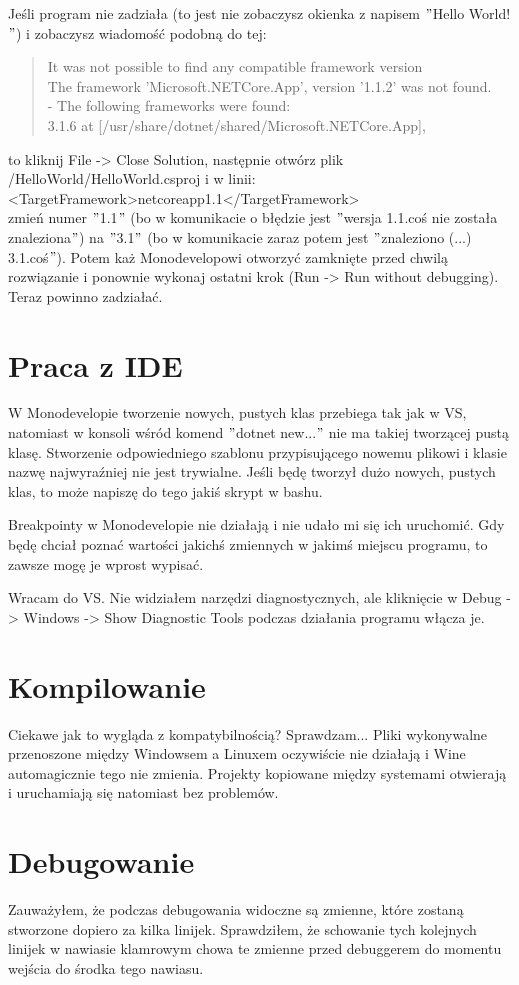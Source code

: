 \documentclass[10pt]{article}
\begin{document}
Jeśli program nie zadziała (to jest nie zobaczysz okienka z napisem $"$Hello World!$"$) i zobaczysz wiadomość podobną do tej:
\begin{quote}
It was not possible to find any compatible framework version\\
The framework 'Microsoft.NETCore.App', version '1.1.2' was not found.\\
\hspace*{2em}- The following frameworks were found:\\
\hspace*{6em}3.1.6 at [/usr/share/dotnet/shared/Microsoft.NETCore.App],
\end{quote}
to kliknij File -> Close Solution, następnie otwórz plik /HelloWorld/HelloWorld.csproj i w linii:\\
<TargetFramework>netcoreapp1.1</TargetFramework>\\
zmień numer $"$1.1$"$ (bo w komunikacie o błędzie jest $"$wersja 1.1.coś nie została znaleziona$"$) na $"$3.1$"$ (bo w komunikacie zaraz potem jest $"$znaleziono (...) 3.1.coś$"$). Potem każ Monodevelopowi otworzyć zamknięte przed chwilą rozwiązanie i ponownie wykonaj ostatni krok (Run -> Run without debugging). Teraz powinno zadziałać.

\section{Praca z IDE}

W Monodevelopie tworzenie nowych, pustych klas przebiega tak jak w VS, natomiast w konsoli wśród komend $"$dotnet new...$"$ nie ma takiej tworzącej pustą klasę. Stworzenie odpowiedniego szablonu przypisującego  nowemu plikowi i klasie nazwę najwyraźniej nie jest trywialne. Jeśli będę tworzył dużo nowych, pustych klas, to może napiszę do tego jakiś skrypt w bashu.

Breakpointy w Monodevelopie nie działają i nie udało mi się ich uruchomić. Gdy będę chciał poznać wartości jakichś zmiennych w jakimś miejscu programu, to zawsze mogę je wprost wypisać.

Wracam do VS. Nie widziałem narzędzi diagnostycznych, ale kliknięcie w Debug -> Windows -> Show Diagnostic Tools podczas działania programu włącza je.

\section{Kompilowanie}

Ciekawe jak to wygląda z kompatybilnością? Sprawdzam... Pliki wykonywalne przenoszone między Windowsem a Linuxem oczywiście nie działają i Wine automagicznie tego nie zmienia. Projekty kopiowane między systemami otwierają i uruchamiają się natomiast bez problemów.

\section{Debugowanie}

Zauważyłem, że podczas debugowania widoczne są zmienne, które zostaną stworzone dopiero za kilka linijek. Sprawdziłem, że schowanie tych kolejnych linijek w nawiasie klamrowym chowa te zmienne przed debuggerem do momentu wejścia do środka tego nawiasu.
\end{document}
